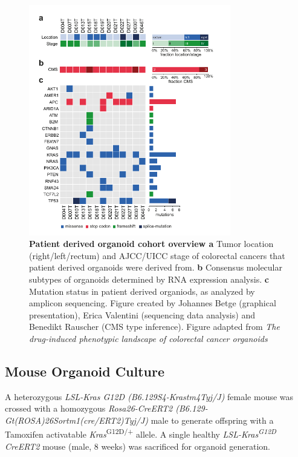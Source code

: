 \begin{flushleft}
\begin{figure}[!h]
\centering
\includegraphics[width=250pt,
                height=\textheight,
                keepaspectratio]{figures/promise/pdf/fig_1_0.pdf}
\caption[Patient derived organoid cohort overview]{\textbf{Patient derived organoid cohort overview a} Tumor location (right/left/rectum) and AJCC/UICC stage of colorectal cancers that patient derived organoids were derived from. \textbf{b}  Consensus molecular subtypes of organoids determined by RNA expression analysis. \textbf{c} Mutation status in patient derived organiods, as analyzed by amplicon sequencing. Figure created by Johannes Betge (graphical presentation),  Erica Valentini (sequencing data analysis) and Benedikt Rauscher (CMS type inference). Figure adapted from \textit{The drug-induced phenotypic landscape of colorectal cancer organoids} \parencite{betgeDruginducedPhenotypicLandscape2022}}
\label{fig_120}
\end{figure}


\subsection{Mouse Organoid Culture}
A heterozygous \textit{LSL-Kras G12D (B6.129S4-Krastm4Tyj/J)} female mouse \parencite{jacksonAnalysisLungTumor2001} was crossed with a homozygous \textit{Rosa26-CreERT2 (B6.129-Gt(ROSA)26Sortm1(cre/ERT2)Tyj/J)} male to generate offspring with a Tamoxifen activatable \textit{Kras}\textsuperscript{G12D/+} allele. A single healthy \textit{LSL-Kras\textsuperscript{G12D} CreERT2} mouse (male, 8 weeks) was sacrificed for organoid generation. \par 


\end{flushleft}
